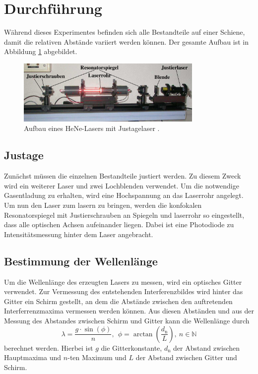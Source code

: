\newpage
\section{Durchführung}
\label{sec:Durchführung}
Während dieses Experimentes befinden sich alle Bestandteile auf einer Schiene,
damit die relativen Abstände variiert werden können. Der gesamte Aufbau ist in
Abbildung \ref{fig:Versuchsaufbau1} abgebildet.
\begin{figure}[htb]
  \centering
  \includegraphics[width=0.8\textwidth]{content/aufbau.png}
  \caption{Aufbau eines HeNe-Lasers mit Justagelaser \cite{anleitung}.}
  \label{fig:Versuchsaufbau1}
\end{figure}
\FloatBarrier

\subsection{Justage}

Zunächst müssen die einzelnen Bestandteile justiert werden.
Zu diesem Zweck wird ein weiterer Laser und zwei Lochblenden verwendet.
Um die notwendige Gasentladung zu erhalten, wird eine Hochspannung an das Laserrohr
angelegt. Um nun den Laser zum lasern zu bringen, werden die konfokalen
Resonatorspiegel mit Justierschrauben an Spiegeln und laserrohr so eingestellt,
dass alle optischen Achsen aufeinander liegen. Dabei ist eine Photodiode zu
Intensitätsmessung hinter dem Laser angebracht.

\subsection{Bestimmung der Wellenlänge}
Um die Wellenlänge
des erzeugten Lasers zu messen, wird ein optisches Gitter verwendet.
Zur Vermessung des entstehenden Interferenzbildes wird hinter das Gitter ein Schirm
gestellt, an dem die Abstände zwischen den auftretenden Interferrenzmaxima vermessen
werden können. Aus diesen Abständen und aus der Messung des Abstandes zwischen Schirm und Gitter
kann die Wellenlänge durch
\begin{equation}
  \lambda = \frac{g\cdot\sin(\phi)}{n},\ \ \phi = \arctan\left(\frac{d_\text{n}}{L}\right),\  n\in\mathds{N}
  \label{eqn:welle}
\end{equation}
berechnet werden. Hierbei ist $g$ die Gitterkonstante, $d_\text{n}$ der Abstand zwischen Hauptmaxima
und $n$-ten Maximum und $L$ der Abstand zwischen Gitter und Schirm.

